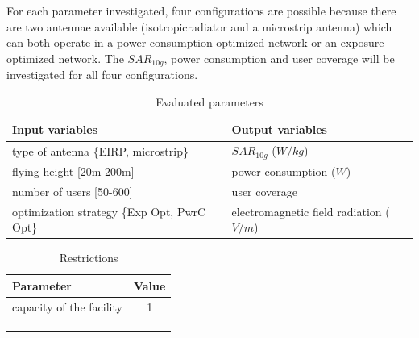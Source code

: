 For each parameter investigated, four configurations are possible because there are two antennae available (\gls{isotropicradiator} and a microstrip antenna) which can both operate in a power consumption optimized network or an exposure optimized 
network. The $SAR_{10g}$, power consumption and user coverage will be investigated for all four configurations.

\begin{table}[h]
\centering
            \begin{tabular}{|l|l|}
            \hline
            \textbf{Input variables  }              & \textbf{Output variables}          \\   \hline 
            type of antenna  \{EIRP, microstrip\}               & $SAR_{10g}$ ($W/kg$)             \\ 
            flying height [20m-200m]                 & power consumption ($W$)          \\ 
            number of users  [50-600]              & user coverage            \\
            optimization strategy \{Exp Opt, PwrC Opt\}        &     electromagnetic field radiation ($V/m$)\\
            \hline
            \end{tabular}
            \caption{Evaluated parameters}
          \label{table:s2:evalpara}
\end{table}
\begin{table}[h]
\centering
        \begin{tabular}{|l|c|}
        \hline
        \textbf{Parameter}            & \textbf{Value}       \\   \hline 
        capacity of the facility          & 1        \\    
        &  \\ 
        & \\ 
        & \\ 
        \hline
        \end{tabular}
        \caption{Restrictions}
        \label{table:S2:restrictions}
\end{table}


